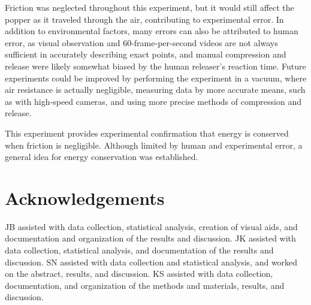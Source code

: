 \documentclass[amsmath,amssymb,aps,endfloats,linenumbers]{revtex4-2}
\begin{document}
Friction was neglected throughout this experiment, but it would still affect the popper as it traveled through the air, contributing to experimental error. In addition to environmental factors, many errors can also be attributed to human error, as visual observation and 60-frame-per-second videos are not always sufficient in accurately describing exact points, and manual compression and release were likely somewhat biased by the human releaser’s reaction time. Future experiments could be improved by performing the experiment in a vacuum, where air resistance is actually negligible, measuring data by more accurate means, such as with high-speed cameras, and using more precise methods of compression and release.

This experiment provides experimental confirmation that energy is conserved when friction is negligible. Although limited by human and experimental error, a general idea for energy conservation was established.

    
    
\section{Acknowledgements}
JB assisted with data collection, statistical analysis, creation of visual aids, and documentation and organization of the results and discussion. JK assisted with data collection, statistical analysis, and documentation of the results and discussion. SN assisted with data collection and statistical analysis, and worked on the abstract, results, and discussion. KS assisted with data collection, documentation, and organization of the methods and materials, results, and discussion.










\end{document}
